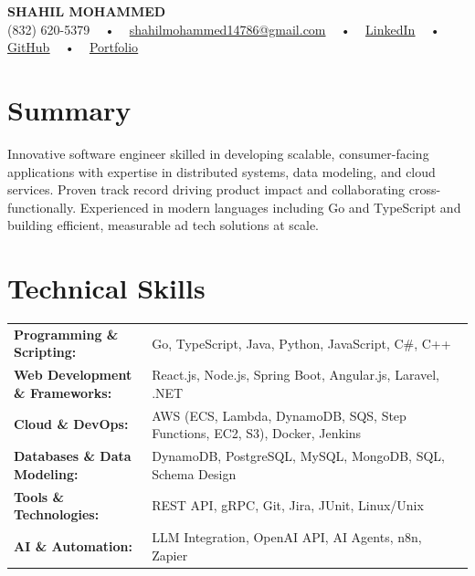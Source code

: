 \documentclass[letterpaper,11pt]{article}
\begin{document}
\begin{center}
    {\fontsize{14pt}{12pt}\selectfont \textbf{\MakeUppercase{Shahil Mohammed}}}\\ \vspace{2pt}
    \fontsize{10pt}{12pt}\selectfont (832) 620-5379 ~ • ~ \href{mailto:shahilmohammed14786@gmail.com}{shahilmohammed14786@gmail.com} ~ • ~  
    \href{https://www.linkedin.com/in/shahil-mohammed-9652931a1/}{\color{blue}\underline{LinkedIn}}  ~ • ~ 
    \href{https://github.com/freakbeast14}{\color{blue}\underline{GitHub}} ~ • ~ 
    \href{https://shahil-mohammed.netlify.app/}{\color{blue}\underline{Portfolio}}
    \vspace{-8pt}
\end{center}

\section{Summary}
\fontsize{9pt}{10pt}\selectfont
Innovative software engineer skilled in developing scalable, consumer-facing applications with expertise in distributed systems, data modeling, and cloud services. Proven track record driving product impact and collaborating cross-functionally. Experienced in modern languages including Go and TypeScript and building efficient, measurable ad tech solutions at scale.
 \vspace{-5pt}
 
\section{Technical Skills}
        \vspace{-14pt}
        \begin{table}[h]
            \fontsize{9pt}{10pt}\selectfont
            \begin{tabular}{p{0.3\linewidth} p{0.7\linewidth}}
                \textbf{Programming \& Scripting:} & Go, TypeScript, Java, Python, JavaScript, C\#, C++ \\
                \textbf{Web Development \& Frameworks:} & React.js, Node.js, Spring Boot, Angular.js, Laravel, .NET \\
                \textbf{Cloud \& DevOps:} & AWS (ECS, Lambda, DynamoDB, SQS, Step Functions, EC2, S3), Docker, Jenkins \\
                \textbf{Databases \& Data Modeling:} & DynamoDB, PostgreSQL, MySQL, MongoDB, SQL, Schema Design \\
                \textbf{Tools \& Technologies:} & REST API, gRPC, Git, Jira, JUnit, Linux/Unix \\
                \textbf{AI \& Automation:} & LLM Integration, OpenAI API, AI Agents, n8n, Zapier \\
            \end{tabular}
        \end{table}
 \vspace{-15pt}
 
\end{document}
